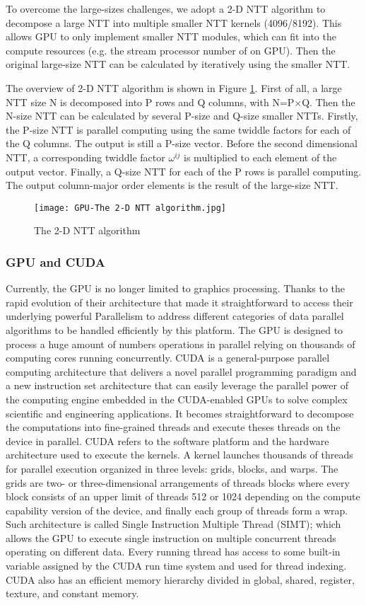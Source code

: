 To overcome the large-sizes challenges, we adopt a 2-D NTT algorithm to decompose a large NTT into multiple smaller NTT kernels (4096/8192). This allows GPU to only implement smaller NTT modules, which can fit into the compute resources (e.g. the stream processor number of on GPU). Then the original large-size NTT can be calculated by iteratively using the smaller NTT.

The overview of 2-D NTT algorithm is shown in Figure \ref{fig:The 2-D NTT Algorithm}. First of all, a large NTT size N is decomposed into P rows and Q columns, with N=P×Q. Then the N-size NTT can be calculated by several P-size and Q-size smaller NTTs. Firstly, the P-size NTT is parallel computing using the same twiddle factors for each of the Q columns. The output is still a P-size vector. Before the second dimensional NTT, a corresponding twiddle factor $\omega^{ij}$ is multiplied to each element of the output vector. Finally, a Q-size NTT for each of the P rows is parallel computing. The output column-major order elements is the result of the large-size NTT.
\begin{figure}[!ht]
    \centering
    \texttt{[image: GPU-The 2-D NTT algorithm.jpg]}
    \caption{The 2-D NTT algorithm}
    \label{fig:The 2-D NTT Algorithm}
\end{figure}
\subsubsection{GPU and CUDA}
Currently, the GPU is no longer limited to graphics processing. Thanks to the rapid evolution of their architecture that made it straightforward to access their underlying powerful Parallelism to address different categories of data parallel algorithms to be handled efficiently by this platform. The GPU is designed to process a huge amount of numbers operations in parallel relying on thousands of computing cores running concurrently. CUDA is a general-purpose parallel computing architecture that delivers a novel parallel programming paradigm and a new instruction set architecture that can easily leverage the parallel power of the computing engine embedded in the CUDA-enabled GPUs to solve complex scientific and engineering applications. It becomes straightforward to decompose the computations into fine-grained threads and execute theses threads on the device in parallel. CUDA refers to the software platform and the hardware architecture used to execute the kernels. A kernel launches thousands of threads for parallel execution organized in three levels: grids, blocks, and warps. The grids are two- or three-dimensional arrangements of threads blocks where every block consists of an upper limit of threads 512 or 1024 depending on the compute capability version of the device, and finally each group of threads form a wrap. Such architecture is called Single Instruction Multiple Thread (SIMT); which allows the GPU to execute single instruction on multiple concurrent threads operating on different data. Every running thread has access to some built-in variable assigned by the CUDA run time system and used for thread indexing. CUDA also has an efficient memory hierarchy divided in global, shared, register, texture, and constant memory.
